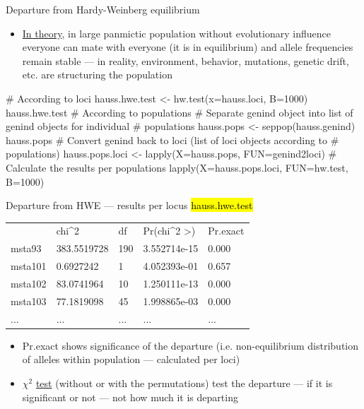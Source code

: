 \documentclass[compress, ucs, xelatex, 11pt, xcolor=svgnames,
  hyperref={
    bookmarks=true,
    unicode=true,
    colorlinks=true,
    pdftitle={Molecular data in R},
    plainpages=false,
    pdfauthor={Vojtech Zeisek},
    pdfsubject={Course about phylogeny and evolution in R},
    pdfcreator={XeLaTeX},
    pdfkeywords={R, evolution, phylogeny, molecular data},
    linkcolor=Tomato,
    anchorcolor=SaddleBrown,
    citecolor=Goldenrod,
    filecolor=DarkMagenta,
    menucolor=Sienna,
    urlcolor=DarkTurquoise,
    pdftex},
  url={hyphens, lowtilde} %
  ]{beamer}
\renewcommand{\texttt}[1]{\hl{\ttfamily #1}}
\begin{document}
\begin{frame}[fragile]{Departure from Hardy-Weinberg equilibrium}
  \begin{itemize}
    \item \href{https://en.wikipedia.org/wiki/Hardy%E2%80%93Weinberg_principle}{In theory}, in large panmictic population without evolutionary influence everyone can mate with everyone (it is in equilibrium) and allele frequencies remain stable --- in reality, environment, behavior, mutations, genetic drift, etc. are structuring the population
  \end{itemize}
  \begin{spluscode}
    # According to loci
    hauss.hwe.test <- hw.test(x=hauss.loci, B=1000)
    hauss.hwe.test
    # According to populations
    # Separate genind object into list of genind objects for individual
    # populations
    hauss.pops <- seppop(hauss.genind)
    hauss.pops
    # Convert genind back to loci (list of loci objects according to
    # populations)
    hauss.pops.loci <- lapply(X=hauss.pops, FUN=genind2loci)
    # Calculate the results per populations
    lapply(X=hauss.pops.loci, FUN=hw.test, B=1000)
  \end{spluscode}
\end{frame}

\begin{frame}[fragile]{Departure from HWE --- results per locus}
  \vfill
  \texttt{hauss.hwe.test}
  \begin{tabular}{lllll}
    & chi\textasciicircum2 & df & Pr(chi\textasciicircum2 >) & Pr.exact\\
    msta93 & 383.5519728 & 190 & 3.552714e-15 & 0.000\\
    msta101 & 0.6927242 & 1 & 4.052393e-01 & 0.657\\
    msta102 & 83.0741964 & 10 & 1.250111e-13 & 0.000\\
    msta103 & 77.1819098 & 45 & 1.998865e-03 & 0.000\\
    ... & ... & ... & ... & ...
  \end{tabular}
  \vfill
  \begin{itemize}
    \item Pr.exact shows significance of the departure (i.e. non-equilibrium distribution of alleles within population --- calculated per loci)
    \item $\chi^2$ \href{https://en.wikipedia.org/wiki/Pearson%27s_chi-squared_test}{test} (without or with the permutations) test the departure --- if it is significant or not --- not how much it is departing
  \end{itemize}
  \vfill
\end{frame}
\end{document}
